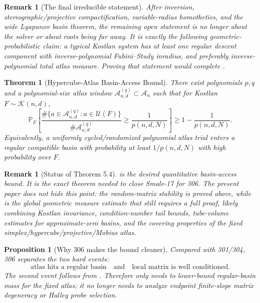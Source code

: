\documentclass[11pt]{article}
\newtheorem{theorem}[definition]{Theorem}
\newtheorem{proposition}[definition]{Proposition}
\newtheorem{remark}[definition]{Remark}
\newcommand{\Prob}{\mathbb P}
\newcommand{\K}{\mathcal K}
\newcommand{\A}{\mathcal A}
\newcommand{\U}{\mathcal U}
\begin{document}
\begin{remark}[The final irreducible statement]
After inversion, stereographic/projective compactification, variable-radius homotheties, and the wide Lyapunov basin theorem, the remaining open statement is no longer about the solver or about roots being far away.  It is exactly the following geometric-probabilistic claim: a typical Kostlan system has at least one regular descent component with inverse-polynomial Fubini--Study inradius, and preferably inverse-polynomial total atlas measure.  Proving that statement would complete .
\end{remark}


\begin{theorem}[Hypercube-Atlas Basin-Access Bound]\label{thm:basin-access}
There exist polynomials $p,q$ and a polynomial-size atlas window $\A_{n,d}^{(q)}\subset\A_n$ such that for Kostlan $F\sim\K(n,d)$,
\[
        \Prob_{F}\left[
        \frac{\#\{a\in\A_{n,d}^{(q)}:a\in\U(F)\}}{\#\A_{n,d}^{(q)}}
        \ge \frac1{p(n,d,N)}
        \right]
        \ge 1-\frac1{p(n,d,N)}.
\]
Equivalently, a uniformly cycled/randomized polynomial atlas trial enters a regular compatible basin with probability at least $1/p(n,d,N)$ with high probability over $F$.
\end{theorem}

\begin{remark}[Status of Theorem 5.4]
 is the desired quantitative basin-access bound.  It is the exact theorem needed to close Smale-17 for 306.  The present paper does not hide this point: the random-matrix stability is proved above, while  is the global geometric measure estimate that still requires a full proof, likely combining Kostlan invariance, condition-number tail bounds, tube-volume estimates for approximate-zero basins, and the covering properties of the fixed simplex/hypercube/projective/Mobius atlas.
\end{remark}

\begin{proposition}[Why 306 makes the bound cleaner]
Compared with 301/304, 306 separates the two hard events:
\[
        \text{atlas hits a regular basin}
        \quad\text{and}\quad
        \text{local matrix is well conditioned}.
\]
The second event follows from .  Therefore  only needs to lower-bound regular-basin mass for the fixed atlas; it no longer needs to analyze endpoint finite-slope matrix degeneracy or Halley probe selection.
\end{proposition}
\end{document}
